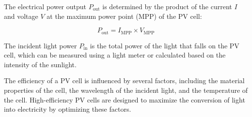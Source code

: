 The electrical power output \( P_{\text{out}} \) is determined by the product of the current \( I \) and voltage \( V \) at the maximum power point (MPP) of the PV cell:

\[
P_{\text{out}} = I_{\text{MPP}} \times V_{\text{MPP}}
\]

The incident light power \( P_{\text{in}} \) is the total power of the light that falls on the PV cell, which can be measured using a light meter or calculated based on the intensity of the sunlight.

The efficiency of a PV cell is influenced by several factors, including the material properties of the cell, the wavelength of the incident light, and the temperature of the cell. High-efficiency PV cells are designed to maximize the conversion of light into electricity by optimizing these factors.

